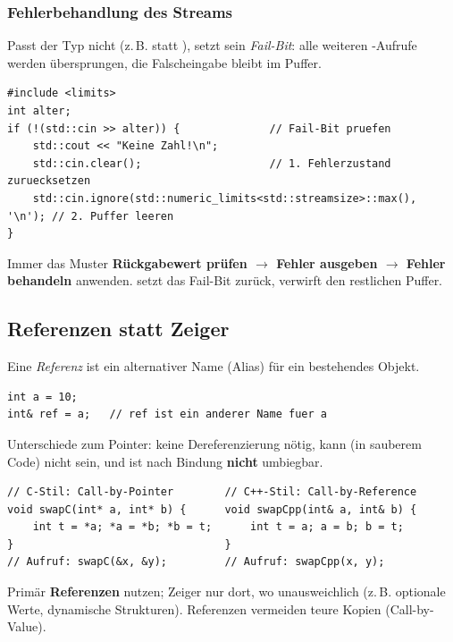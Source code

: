 \subsubsection*{Fehlerbehandlung des Streams}
Passt der Typ nicht (z.\,B.  statt ), setzt  sein \emph{Fail-Bit}: alle weiteren -Aufrufe werden \"ubersprungen, die Falscheingabe bleibt im Puffer.
\begin{lstlisting}
#include <limits>
int alter;
if (!(std::cin >> alter)) {              // Fail-Bit pruefen
    std::cout << "Keine Zahl!\n";
    std::cin.clear();                    // 1. Fehlerzustand zuruecksetzen
    std::cin.ignore(std::numeric_limits<std::streamsize>::max(), '\n'); // 2. Puffer leeren
}
\end{lstlisting}
\begin{merke}
Immer das Muster \textbf{R\"uckgabewert pr\"ufen $\rightarrow$ Fehler ausgeben $\rightarrow$ Fehler behandeln} anwenden.  setzt das Fail-Bit zur\"uck,  verwirft den restlichen Puffer.
\end{merke}

\subsection{Referenzen statt Zeiger}
Eine \emph{Referenz} ist ein alternativer Name (Alias) f\"ur ein bestehendes Objekt.
\begin{lstlisting}
int a = 10;
int& ref = a;   // ref ist ein anderer Name fuer a
\end{lstlisting}
Unterschiede zum Pointer: keine Dereferenzierung n\"otig, kann (in sauberem Code) nicht  sein, und ist nach Bindung \textbf{nicht} umbiegbar.

\begin{beispiel}
\begin{lstlisting}
// C-Stil: Call-by-Pointer        // C++-Stil: Call-by-Reference
void swapC(int* a, int* b) {      void swapCpp(int& a, int& b) {
    int t = *a; *a = *b; *b = t;      int t = a; a = b; b = t;
}                                 }
// Aufruf: swapC(&x, &y);         // Aufruf: swapCpp(x, y);
\end{lstlisting}
\end{beispiel}
\begin{tipp}
Prim\"ar \textbf{Referenzen} nutzen; Zeiger nur dort, wo unausweichlich (z.\,B. optionale Werte, dynamische Strukturen). Referenzen vermeiden teure Kopien (Call-by-Value).
\end{tipp}

